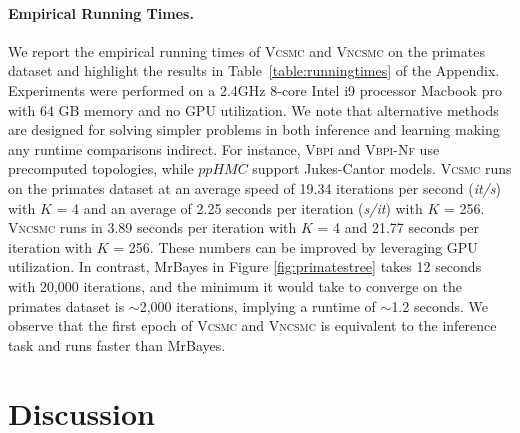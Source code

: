 \documentclass[accepted]{uai2021} %
\theoremstyle{definition}
\begin{document}
\paragraph{Empirical Running Times.} We report the empirical running times of \textsc{Vcsmc} and \textsc{Vncsmc} on the primates dataset and highlight the results in Table~\ref{table:runningtimes} of the Appendix. Experiments were performed on a 2.4GHz 8-core Intel i9 processor Macbook pro with 64 GB memory and no GPU utilization. We note that alternative methods are designed for solving simpler problems in both inference and learning making any runtime comparisons indirect. For instance, \textsc{Vbpi} and \textsc{Vbpi-Nf} use precomputed topologies, while $ppHMC$ support Jukes-Cantor models.  \textsc{Vcsmc} runs on the primates dataset at an average speed of 19.34 iterations per second (\textit{it/s}) with $K$ = 4 and an average of 2.25 seconds per iteration (\textit{s/it}) with $K$ = 256. \textsc{Vncsmc} runs in 3.89 seconds per iteration with $K$ = 4 and 21.77 seconds per iteration with $K$ = 256. These numbers can be improved by leveraging GPU utilization. In contrast, MrBayes in Figure \ref{fig:primatestree} takes 12 seconds with 20,000 iterations, and the minimum it would take to converge on the primates dataset is $\sim$2,000 iterations, implying a runtime of $\sim$1.2 seconds. We observe that the first epoch of \textsc{Vcsmc} and \textsc{Vncsmc} is equivalent to the inference task and runs faster than MrBayes.

\iffalse
\fi

\section{Discussion}
\end{document}
